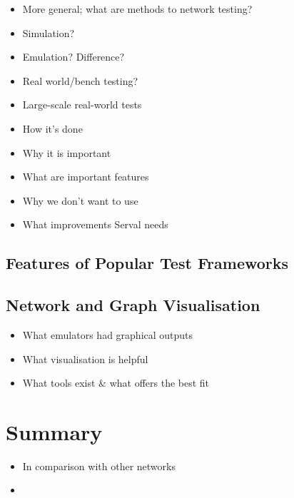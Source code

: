 \begin{itemize}
    \item More general; what are methods to network testing?
    \item Simulation?
    \item Emulation? Difference?
    \item Real world/bench testing?
    \item Large-scale real-world tests
    \item How it's done
    \item Why it is important
    \item What are important features
    \item Why we don't want to use 
    \item What improvements Serval needs
\end{itemize}

\subsection{Features of Popular Test Frameworks}


\subsection{Network and Graph Visualisation}
\begin{itemize}
    \item What emulators had graphical outputs
    \item What visualisation is helpful
    \item What tools exist \& what offers the best fit
\end{itemize}


\section{Summary}
\begin{itemize}
    \item In comparison with other networks
    \item 
\end{itemize}
